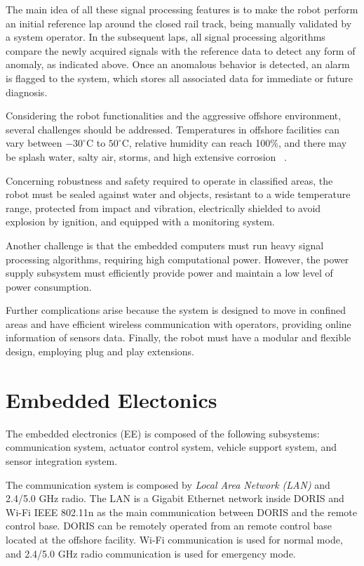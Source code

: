 \documentclass{ifacconf}
\begin{document}
The main idea of all these signal processing features is to make the robot
perform an initial reference lap around the closed rail track, being manually
validated by a system operator. In the subsequent laps, all signal processing
algorithms compare the newly acquired signals with the reference data to detect
any form of anomaly, as indicated above. Once an anomalous behavior is
detected, an alarm is flagged to the system, which stores all associated data
for immediate or future diagnosis.


Considering the robot functionalities and the aggressive offshore environment,
several challenges should be addressed. Temperatures in offshore facilities can
vary between $-30^{\circ}$C to $50^{\circ}$C, relative humidity can reach
100\%, and there may be splash water, salty air, storms, and high extensive
corrosion ~\cite{graf2007mobile}. 

Concerning robustness and safety required to operate in classified areas, the
robot must be sealed against water and objects, resistant to a wide temperature
range, protected from impact and vibration, electrically shielded to avoid
explosion by ignition, and equipped with a monitoring system.


Another challenge is that the embedded computers must run heavy signal
processing algorithms, requiring high computational power. However, the power
supply subsystem must efficiently provide power and maintain a low level of
power consumption.

Further complications arise because the system is designed to move in confined
areas and have efficient wireless communication with operators, providing
online information of sensors data. Finally, the robot must have a modular and
flexible design, employing plug and play extensions.


\section{Embedded Electonics}\label{sec:electronics_overview}
The embedded electronics (EE) is composed of the following subsystems:
communication system, actuator control system, vehicle support system, and
sensor integration system. 

The communication system is composed by \emph{Local Area Network (LAN)} and
2.4/5.0 GHz radio. 
\newline
The LAN is a Gigabit Ethernet network inside DORIS and Wi-Fi IEEE
802.11n as the main communication between DORIS and the remote control base.
DORIS can be remotely operated from an remote control base located at the
offshore facility. Wi-Fi communication is used for normal mode, and 2.4/5.0 GHz
radio communication is used for emergency mode.
\end{document}
